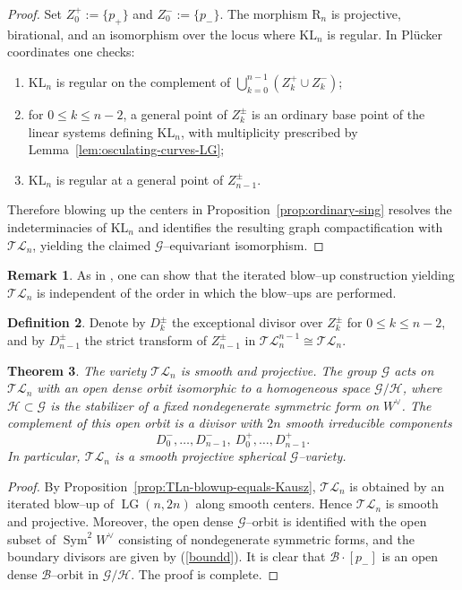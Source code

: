 \documentclass[10pt]{amsart}
\newtheorem{theorem}{Theorem}[section]
\theoremstyle{definition}
\newtheorem{definition}[theorem]{Definition}
\newtheorem{remark}[theorem]{Remark}
\newcommand{\LG}{\operatorname{LG}}
\DeclareMathOperator{\Sym}{Sym}
\newcommand{\TL}{\mathcal{TL}}
\newcommand{\KL}{\mathrm{KL}}
\newcommand{\RL}{\mathrm{R}}
\theoremstyle{plain} %
\begin{document}
\begin{proof}
Set $Z_0^+ := \{p_+\}$ and $Z_0^- := \{p_-\}$.
The morphism $\RL_n$ is projective, birational, and an isomorphism over the locus where $\KL_n$ is regular.
In Pl\"ucker coordinates one checks:
\begin{enumerate}[label=(\alph*)]
    \item $\KL_n$ is regular on the complement of $\bigcup_{k=0}^{n-1}(Z_k^+\cup Z_k^-)$;
  \item  for $0\le k\le n-2$, a general point of $Z_k^\pm$ is an ordinary base point of the linear systems defining $\KL_n$, with multiplicity prescribed by Lemma~\ref{lem:osculating-curves-LG};
  \item  $\KL_n$ is regular at a general point of $Z_{n-1}^\pm$.
\end{enumerate}
Therefore blowing up the centers in Proposition~\ref{prop:ordinary-sing} resolves the indeterminacies of $\KL_n$ and identifies the resulting graph compactification with $\TL_n$, yielding the claimed $\mathscr{G}$--equivariant isomorphism.
\end{proof}

\begin{remark}
As in \cite[Lemma 2.2]{FW}, one can show that the iterated blow--up construction yielding $\TL_n$ is independent of the order in which the blow--ups are performed.     
\end{remark}
\begin{definition}\label{dk}
Denote by $D_k^\pm$ the exceptional divisor over $Z_k^\pm$ for $0\leq k\leq n-2$, and by $D_{n-1}^\pm$
the strict transform of $Z_{n-1}^\pm$ in $\TL_n^{n-1}\cong\TL_n$.  
\end{definition}

\begin{theorem}\label{thm:TLn-spherical}
The variety $\TL_n$ is smooth and projective. The group $\mathscr{G}$
acts on $\TL_n$ with an open dense orbit isomorphic to a homogeneous space $\mathscr{G}/\mathscr H$, where $\mathscr H\subset\mathscr G$ is the stabilizer of a fixed nondegenerate symmetric form on $W^\vee$. The complement of this open orbit is a divisor with $2n$ smooth irreducible components
\begin{equation}\label{boundd}
D_0^-,\dots,D_{n-1}^-,\ D_0^+,\dots,D_{n-1}^+.
\end{equation}
In particular, $\TL_n$ is a smooth projective spherical $\mathscr G$--variety.
\end{theorem}

\begin{proof}
By Proposition~\ref{prop:TLn-blowup-equals-Kausz}, $\TL_n$ is obtained by an iterated blow--up of $\LG(n,2n)$ along smooth centers. Hence $\TL_n$ is smooth and projective. Moreover, the open dense $\mathscr{G}$--orbit is identified with the open subset of $\Sym^2 W^\vee$ consisting of nondegenerate symmetric forms, and the boundary divisors are given by (\ref{boundd}). It is clear that $\mathscr{B}\cdot[p_{-}]$ is an open dense $\mathscr{B}$--orbit in $\mathscr G/\mathscr H$. The proof is complete.
\end{proof}
\end{document}
